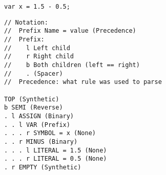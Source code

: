 \documentclass{article}
\newcommand{\comment}[1]{}%
\newcommand{\func}[1]{\textcolor{func}{\tt #1}}
\newcommand{\TOK}[1]{\textcolor{opcode}{TOK\_#1}}
\newcommand{\Token}[2][]{%
  \ifthenelse{\isempty{#1}}%
  {\TOK{#2}}%
  {\TOK{#2} (value: #1)}%
}
\newcommand{\fp}{\textcolor{func}{()}}
\begin{document}
\begin{lstlisting}[language=nasal]
var x = 1.5 - 0.5;
\end{lstlisting}

\begin{lstlisting}
// Notation:
//  Prefix Name = value (Precedence)
//  Prefix:
//    l Left child
//    r Right child
//    b Both children (left == right)
//    . (Spacer)
//  Precedence: what rule was used to parse

TOP (Synthetic)
b SEMI (Reverse)
. l ASSIGN (Binary)
. . l VAR (Prefix)
. . . r SYMBOL = x (None)
. . r MINUS (Binary)
. . . l LITERAL = 1.5 (None)
. . . r LITERAL = 0.5 (None)
. r EMPTY (Synthetic)
\end{lstlisting}

\comment{
\tikzstyle{vertex}=[draw,fill=black!15,minimum size=20pt,inner sep=0pt]

\begin{tikzpicture}[font=\sffamily,thick,level/.style={sibling distance=50mm/#1}]
	\node[vertex] {TOK\_SEMI}
		child { 
			node[vertex] {TOK\_ASSIGN}
			child { 
				node[vertex] {TOK\_VAR}
			   }
		   }
		child {
			node[vertex] {TOK\_SYMBOL}
		   };
\end{tikzpicture}
\\\\ %
\begin{tikzpicture}[font=\sffamily,thick,level/.style={sibling distance=100mm/#1}]
    \node[vertex] {TOK\_TOP}
    child {
        node[vertex] {TOK\_SEMI}
        child {
            node[vertex] {TOK\_ASSIGN}
            child {
                node[vertex] {TOK\_VAR}
            }
            child {
                node[vertex] {TOK\_MINUS}
                child {
                    node[vertex] {TOK\_LITERAL\\1.5}
                }
                child {
                    node[vertex] {TOK\_LITERAL\\0.5}
                }
            }
        }
        child {
            node[vertex] {TOK\_EMPTY}
        }
    };
\end{tikzpicture}
\\\\
\begin{tikzpicture}[font=\sffamily,thick,level/.style={sibling distance=50mm/#1}]
\tikzset{every tree node/.append style={draw}}
\Tree [.\Token{TOP}
         \edge node[auto=right]{\func{LEFT}\fp}; \Token{SEMI}
         \Token{OTHER}
         \edge node[auto=left]{\func{RIGHT}\fp}; \Token{SEMI}
         ]
\end{tikzpicture}%

}
\end{document}

